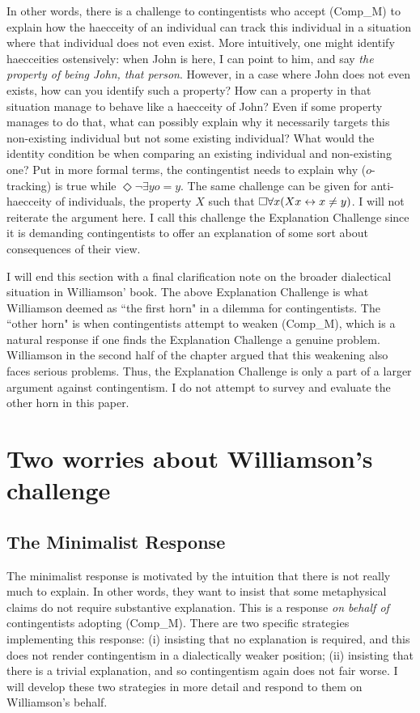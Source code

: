 In other words, there is a challenge to contingentists who accept (Comp_M) to explain how the haecceity of an individual can track this individual in a situation where that individual does not even exist. More intuitively, one might identify haecceities ostensively: when John is here, I can point to him, and say \textit{the property of being John, that person}. However, in a case where John does not even exists, how can you identify such a property? How can a property in that situation manage to behave like a haecceity of John? Even if some property manages to do that, what can possibly explain why it necessarily targets this non-existing individual but not some existing individual? What would the identity condition be when comparing an existing individual and non-existing one?  
Put in more formal terms, the contingentist needs to explain why ($o$-tracking) is true while $\Diamond \neg \exists y o=y$. 
The same challenge can be given for anti-haecceity of individuals, the property $X$ such that $\Box \forall x (Xx \leftrightarrow x \neq y)$. I will not reiterate the argument here. I call this challenge the Explanation Challenge since it is demanding contingentists to offer an explanation of some sort about consequences of their view. 

I will end this section with a final clarification note on the broader dialectical situation in Williamson' book. The above Explanation Challenge is what Williamson deemed as ``the first horn" in a dilemma for contingentists. The ``other horn" is when contingentists attempt to weaken (Comp_M), which is a natural response if one finds the Explanation Challenge a genuine problem. Williamson in the second half of the chapter argued that this weakening also faces serious problems. Thus, the Explanation Challenge is only a part of a larger argument against contingentism. I do not attempt to survey and evaluate the other horn in this paper. 

\section{Two worries about Williamson's challenge}
\subsection{The Minimalist Response}
The minimalist response is motivated by the intuition that there is not really much to explain. In other words, they want to insist that some metaphysical claims do not require substantive explanation. This is a response \emph{on behalf of} contingentists adopting (Comp_M). 
There are two specific strategies implementing this response: (i) insisting that no explanation is required, and this does not render contingentism in a dialectically weaker position; (ii) insisting that there is a trivial explanation, and so contingentism again does not fair worse. I will develop these two strategies in more detail and respond to them on Williamson's behalf. 

